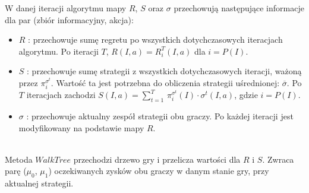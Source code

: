 \documentclass[licencjacka]{pracamgr}
\begin{document}
\noindent
W danej iteracji algorytmu mapy $R$, $S$ oraz $\sigma$ przechowują następujące informacje
dla par (zbiór informacyjny, akcja):
\begin{itemize}
\item $R$ : przechowuje sumę regretu po wszystkich dotychczasowych iteracjach algorytmu. Po iteracji $T$, $R(I, a) = R_i^T(I, a)$
        dla $i = P(I)$.
\item $S$ : przechowuje sumę strategii z wszystkich dotychczasowych iteracji, ważoną przez $\pi_i^{\sigma^t}$. Wartość ta jest
            potrzebna do obliczenia strategii uśrednionej: $\overline{\sigma}$. Po $T$ iteracjach zachodzi
            $S(I, a) = \sum\limits_{t=1}^T \, \pi_i^{\sigma^t}(I) \cdot \sigma^t(I, a)$, gdzie $i = P(I)$.
\item $\sigma$ : przechowuje aktualny zespół strategii obu graczy. Po każdej iteracji jest modyfikowany na podstawie mapy $R$.
\end{itemize}

$\,$ \\

\noindent
Metoda $WalkTree$ przechodzi drzewo gry i przelicza wartości dla $R$ i $S$. Zwraca parę
($\mu_0$, $\mu_1$) oczekiwanych zysków obu graczy w danym stanie gry, przy aktualnej strategii. \\\\
\end{document}
